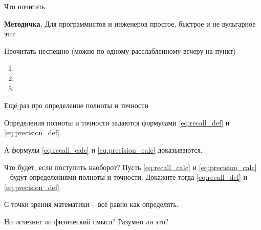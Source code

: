 \begin{frame}{Что почитать}

\textbf{Методичка.} Для программистов и инженеров простое, быстрое и не вульгарное это: 
\begin{center}
\end{center}

\footnotesize
Прочитать неспешно
(можно по одному расслабленному вечеру на пункт)
\begin{enumerate}
	\item {}
	\item {}
	\item {}
\end{enumerate}

\end{frame}



\begin{frame}{Ещё раз про определение полноты и точности}
	
	Определения полноты и точности задаются формулами  \eqref{eq:recall_def} и \eqref{eq:precision_def}.
	
	А формулы \eqref{eq:recall_calc} и \eqref{eq:precision_calc}
	доказываются.
	
	Что будет, если поступить наоборот? 
	Пусть \eqref{eq:recall_calc} и \eqref{eq:precision_calc} -- будут определениями
	полноты и точности. 
	Докажите тогда  \eqref{eq:recall_def} и \eqref{eq:precision_def}.
	
	С точки зрения математики -- всё равно как определять.
	
	Но исчезнет ли физический смысл? Разумно ли это?
	
\end{frame}


